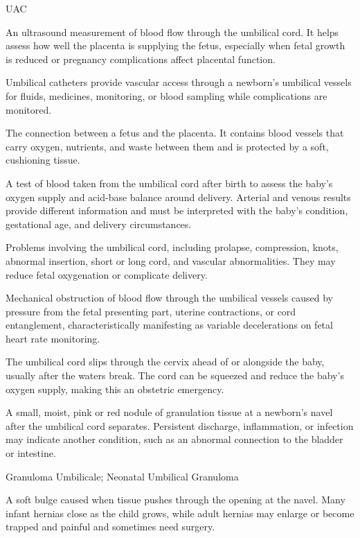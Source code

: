 \synonyms
UAC

 An ultrasound measurement of blood flow through the umbilical cord. It helps assess how well the placenta is supplying the fetus, especially when fetal growth is reduced or pregnancy complications affect placental function.

 Umbilical catheters provide vascular access through a newborn’s umbilical vessels for fluids, medicines, monitoring, or blood sampling while complications are monitored.

 The connection between a fetus and the placenta. It contains blood vessels that carry oxygen, nutrients, and waste between them and is protected by a soft, cushioning tissue.

 A test of blood taken from the umbilical cord after birth to assess the baby’s oxygen supply and acid-base balance around delivery. Arterial and venous results provide different information and must be interpreted with the baby’s condition, gestational age, and delivery circumstances.

 Problems involving the umbilical cord, including prolapse, compression, knots, abnormal insertion, short or long cord, and vascular abnormalities. They may reduce fetal oxygenation or complicate delivery.

 Mechanical obstruction of blood flow through the umbilical vessels caused by pressure from the fetal presenting part, uterine contractions, or cord entanglement, characteristically manifesting as variable decelerations on fetal heart rate monitoring.

 The umbilical cord slips through the cervix ahead of or alongside the baby, usually after the waters break. The cord can be squeezed and reduce the baby’s oxygen supply, making this an obstetric emergency.

 A small, moist, pink or red nodule of granulation tissue at a newborn’s navel after the umbilical cord separates. Persistent discharge, inflammation, or infection may indicate another condition, such as an abnormal connection to the bladder or intestine.

\synonyms
Granuloma Umbilicale; Neonatal Umbilical Granuloma

 A soft bulge caused when tissue pushes through the opening at the navel. Many infant hernias close as the child grows, while adult hernias may enlarge or become trapped and painful and sometimes need surgery.

